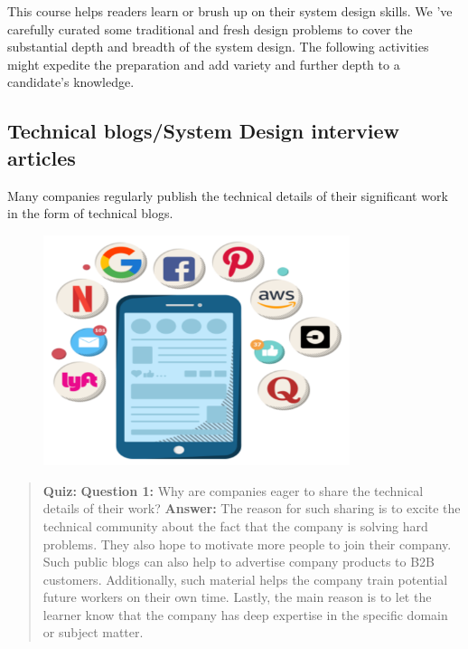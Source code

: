 This course helps readers learn or brush up on their system design skills. We 've carefully curated some traditional and fresh design problems to cover the substantial depth and breadth of the system design. The following activities might expedite the preparation and add variety and further depth to a candidate's knowledge.

\subsection{Technical blogs/System Design interview articles}\label{AVkodIpO9v5zZuv5hm-2f}

Many companies regularly publish the technical details of their significant work in the form of technical blogs.

\begin{figure}[htbp]
 \centering
 \includegraphics[width=0.8\textwidth]{Images/chapter_1/section_5546916426809344/4830700849463296.png}
 
\end{figure}

\begin{quote}
\textbf{Quiz:}
\textbf{Question 1:} Why are companies eager to share the technical details of their work?
\textbf{Answer:} The reason for such sharing is to excite the technical community about the fact that the company is solving hard problems. They also hope to motivate more people to join their company. Such public blogs can also help to advertise company products to B2B customers. Additionally, such material helps the company train potential future workers on their own time. Lastly, the main reason is to let the learner know that the company has deep expertise in the specific domain or subject matter.
\end{quote}

